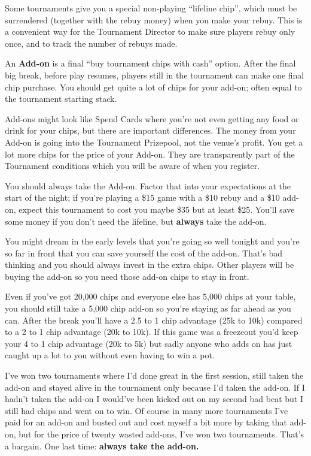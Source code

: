 Some tournaments give you a special non-playing ``lifeline chip'',
which must be surrendered (together with the rebuy money) when you
make your rebuy. This is a convenient way for the Tournament
Director to make sure players rebuy only once, and to track the number
of rebuys made.

An \textbf{Add-on} is a final ``buy tournament chips with cash''
option. After the final big break, before play resumes, players still
in the tournament can make one final chip purchase. You should get
quite a lot of chips for your add-on; often equal to the tournament
starting stack.

Add-ons might look like Spend Cards where you're not even
getting any food or drink for your chips, but there are important
differences. The money from your Add-on is going into the Tournament
Prizepool, not the venue's profit. You get a lot more chips for
the price of your Add-on. They are transparently part of the
Tournament conditions which you will be aware of when you register.

You should always take the Add-on. Factor that into your expectations
at the start of the night; if you're playing a \$15 game with a \$10
rebuy and a \$10 add-on, expect this tournament to cost you maybe
\$35 but at least \$25. You'll save some money if you don't
need the lifeline, but \textbf{always} take the add-on.

You might dream in the early levels that you're going so well
tonight and you're so far in front that you can save yourself
the cost of the add-on. That's bad thinking and you should always
invest in the extra chips. Other players will be buying the add-on
so you need those add-on chips to stay in front.

Even if you've got 20,000 chips and everyone else has 5,000 chips at
your table, you should still take a 5,000 chip add-on so you're staying
as far ahead as you can. After the break you'll have a 2.5 to 1 chip
advantage (25k to 10k) compared to a 2 to 1 chip advantage (20k to 10k).
If this game was a freezeout you'd keep your 4 to 1 chip advantage
(20k to 5k) but sadly anyone who adds on has just caught up a lot to you
without even having to win a pot.

I've won two tournaments where I'd done great in the first session,
still taken the add-on and stayed alive in the tournament only because
I'd taken the add-on. If I hadn't taken the add-on I would've been
kicked out on my second bad beat but I still had chips
and went on to win. Of course in many more tournaments
I've paid for an add-on and busted out and cost myself a bit more by
taking that add-on, but for the price of twenty wasted add-ons, I've won two
tournaments. That's a bargain. One last time: \textbf{always take the add-on.}

